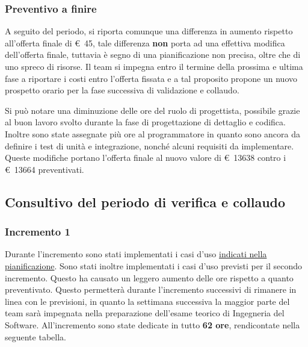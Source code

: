         \subsubsection{Preventivo a finire}
            A seguito del periodo, si riporta comunque una differenza in aumento rispetto all'offerta finale di \euro\ 45,
            tale differenza \textbf{non} porta ad una effettiva modifica dell'offerta finale, tuttavia è segno di una pianificazione non precisa,
            oltre che di uno spreco di risorse.
            Il team si impegna entro il termine della prossima e ultima fase a riportare i costi entro l'offerta fissata e a tal proposito propone
            un nuovo prospetto orario per la fase successiva di validazione e collaudo.
            \def\salarycontent{
                {Amministratore,16,20,320},
                {Analista,0,25,0},
                {Progettista,$48-\noexpand\textbf{8}$,22,880},
                {Programmatore,$43+\noexpand\textbf{7}$,15,750},
                {Responsabile,15,30,450},
                {Verificatore,60,15,900},
                {Totale,181,127,$3371-\noexpand\textbf{71} = 3300 $ },
            }
            
            \label{table:nuovo_orario_verifica}
            Si può notare una diminuzione delle ore del ruolo di progettista, possibile grazie
            al buon lavoro svolto durante la fase di progettazione di dettaglio e codifica.
            Inoltre sono state assegnate più ore al programmatore in quanto sono ancora da definire
            i test di unità e integrazione, nonché alcuni requisiti da implementare. \\
            \noindent Queste modifiche portano l'offerta finale al nuovo valore di \euro\ 13638 contro
            i \euro\ 13664 preventivati.
\subsection{Consultivo del periodo di verifica e collaudo}
    \subsubsection{Incremento 1}
        Durante l'incremento sono stati implementati i casi d'uso \hyperref[table:pianificazione_verifica]{indicati nella pianificazione}. Sono stati inoltre implementati i casi d'uso previsti per il secondo incremento. Questo ha causato un leggero aumento delle ore rispetto a quanto preventivato. Questo permetterà durante l'incremento successivi di rimanere in linea con le previsioni, in quanto la settimana successiva la maggior parte del team sarà impegnata nella preparazione dell'esame teorico di Ingegneria del Software. All'incremento sono state dedicate in tutto \textbf{62 ore}, rendicontate nella seguente tabella.
        \def\salarycontent{
            {Amministratore,4,20,80},
            {Analista,      0,25,0},
            {Progettista,   10,22,220},
            {Programmatore, 35,15,525},
            {Responsabile,  3,30,90},
            {Verificatore,  10,15,150},
            {Totale,        62,127, 1075},
        }
        
